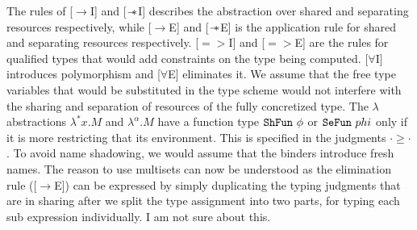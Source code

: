 The rules of [$\rightarrow$I] and [$\mathrel{-\mkern-6mu*}$I] describes the abstraction over shared and
separating resources respectively, while [$\rightarrow$E] and [$\mathrel{-\mkern-6mu*}$E] is the application
rule for shared and separating resources respectively. [$=>$I] and [$=>$E] are the rules for
qualified types that would add constraints on the type being computed. [$\forall$I] introduces
polymorphism and [$\forall$E] eliminates it. We assume that the free type variables that
would be substituted in the type scheme would not interfere with the sharing and separation
of resources of the fully concretized type. The $\lambda$ abstractions $\lambda^{*} x. M$ and $\lambda^{\alpha}.M$
have a function type $\texttt{ShFun}\ \phi$ or $\texttt{SeFun}\ phi$ only if it is more restricting that its environment.
This is specified in the judgments $\cdot \geq \cdot$. To avoid name shadowing, we would assume that
the binders introduce fresh names. The reason to use multisets can now be understood
as the elimination rule ([$\rightarrow$E]) can be expressed by simply duplicating the typing
judgments that are in sharing after we split the type assignment into two parts,
for typing each sub expression individually.{\color{red} I am not sure about this}.
